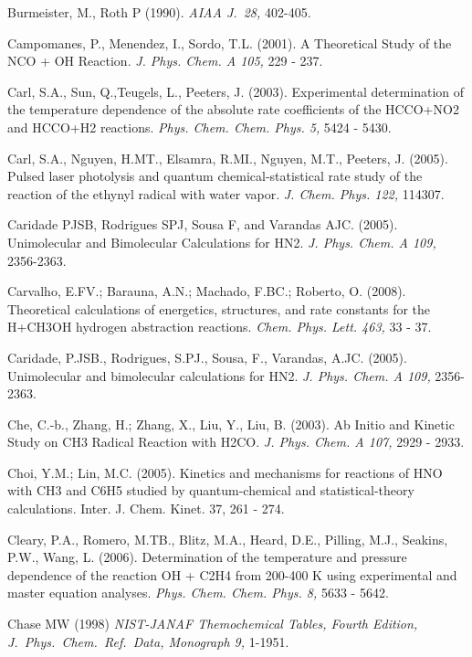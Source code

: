 \documentclass[12pt,landscape]{article}
\newcounter{reaction}
\newcounter{photo}
\begin{document}
Burmeister, M., Roth P (1990).  {\em AIAA J.\  28,} 402-405.

Campomanes, P., Menendez, I., Sordo, T.L. (2001). A Theoretical Study of the NCO + OH Reaction. {\em J. Phys. Chem. A 105,}  229 - 237.

Carl, S.A., Sun, Q.,Teugels, L., Peeters, J.  (2003).  Experimental determination of the temperature dependence of the absolute rate coefficients of the HCCO+NO2 and HCCO+H2 reactions.  {\em Phys. Chem. Chem. Phys. 5,}  5424 - 5430.

Carl, S.A., Nguyen, H.MT., Elsamra, R.MI., Nguyen, M.T., Peeters, J. (2005). Pulsed laser photolysis and quantum chemical-statistical rate study of the reaction of the ethynyl radical with water vapor.  {\em J. Chem. Phys. 122,} 114307.

Caridade PJSB, Rodrigues SPJ, Sousa F, and Varandas AJC. (2005). Unimolecular and Bimolecular Calculations for HN2. {\em J. Phys. Chem. A  109,} 2356-2363.

Carvalho, E.FV.; Barauna, A.N.; Machado, F.BC.; Roberto, O. (2008).  Theoretical calculations of energetics, structures, and rate constants for the H+CH3OH hydrogen abstraction reactions. {\em Chem. Phys. Lett.  463,}  33 - 37.

Caridade, P.JSB., Rodrigues, S.PJ., Sousa, F., Varandas, A.JC. (2005). Unimolecular and bimolecular calculations for HN2.   {\em J. Phys. Chem. A  109,} 2356-2363. 

Che, C.-b., Zhang, H.; Zhang, X., Liu, Y., Liu, B. (2003). Ab Initio and Kinetic Study on CH3 Radical Reaction with H2CO.  {\em J. Phys. Chem. A 107,} 2929 - 2933.

Choi, Y.M.; Lin, M.C.  (2005). Kinetics and mechanisms for reactions of HNO with CH3 and C6H5 studied by quantum-chemical and statistical-theory calculations.   Inter. J. Chem. Kinet.   37,  261 - 274. 

Cleary, P.A., Romero, M.TB., Blitz, M.A., Heard, D.E., Pilling, M.J., Seakins, P.W., Wang, L. (2006). Determination of the temperature and pressure dependence of the reaction OH + C2H4 from 200-400 K using experimental and master equation analyses. {\em Phys. Chem. Chem. Phys. 8,} 5633 - 5642.

Chase MW (1998) {\em NIST-JANAF Themochemical Tables, Fourth Edition, J.\ Phys.\ Chem.\ Ref.\ Data, Monograph 9,} 1-1951.
\end{document}
